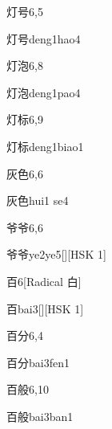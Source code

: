 \begin{entry}{灯号}{6,5}
  \begin{phonetics}{灯号}{deng1hao4}
  \end{phonetics}
\end{entry}

\begin{entry}{灯泡}{6,8}
  \begin{phonetics}{灯泡}{deng1pao4}
  \end{phonetics}
\end{entry}

\begin{entry}{灯标}{6,9}
  \begin{phonetics}{灯标}{deng1biao1}
  \end{phonetics}
\end{entry}

\begin{entry}{灰色}{6,6}
  \begin{phonetics}{灰色}{hui1 se4}
  \end{phonetics}
\end{entry}

\begin{entry}{爷爷}{6,6}
  \begin{phonetics}{爷爷}{ye2ye5}[][HSK 1]
  \end{phonetics}
\end{entry}

\begin{entry}{百}{6}[Radical 白]
  \begin{phonetics}{百}{bai3}[][HSK 1]
  \end{phonetics}
\end{entry}

\begin{entry}{百分}{6,4}
  \begin{phonetics}{百分}{bai3fen1}
  \end{phonetics}
\end{entry}

\begin{entry}{百般}{6,10}
  \begin{phonetics}{百般}{bai3ban1}
  \end{phonetics}
\end{entry}

